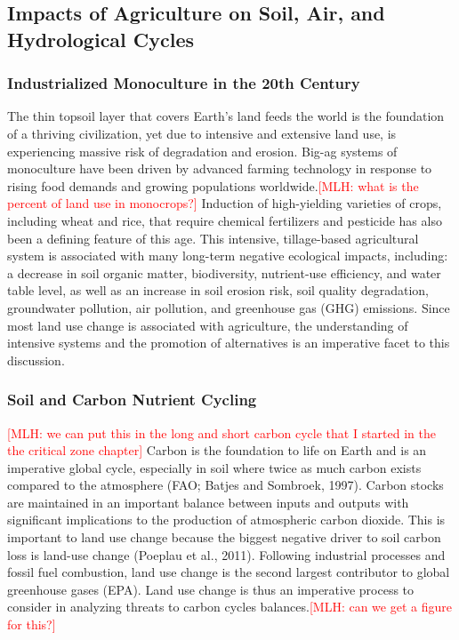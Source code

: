 \documentclass{book}\usepackage{knitr}
\newcommand{\red}[1]{\textcolor{red}{[MLH: #1]}}
\begin{document}
\begin{knitrout}
\begin{kframe}
\subsection{Impacts of Agriculture on Soil, Air, and Hydrological Cycles}

\subsubsection{Industrialized Monoculture in the 20th Century}
The thin topsoil layer that covers Earth’s land feeds the world is the foundation of a thriving civilization, yet due to intensive and extensive land use, is experiencing massive risk of degradation and erosion. Big-ag systems of monoculture have been driven by advanced farming technology in response to rising food demands and growing populations worldwide.\red{what is the percent of land use in monocrops?} Induction of high-yielding varieties of crops, including wheat and rice, that require chemical fertilizers and pesticide has also been a defining feature of this age. This intensive, tillage-based agricultural system is associated with many long-term negative ecological impacts, including: a decrease in soil organic matter, biodiversity, nutrient-use efficiency, and water table level, as well as an increase in soil erosion risk, soil quality degradation, groundwater pollution, air pollution, and greenhouse gas (GHG) emissions. Since most land use change is associated with agriculture, the understanding of intensive systems and the promotion of alternatives is an imperative facet to this discussion.

\subsubsection{Soil and Carbon Nutrient Cycling}\red{we can put this in the long and short carbon cycle that I started in the the critical zone chapter}
Carbon is the foundation to life on Earth and is an imperative global cycle, especially in soil where twice as much carbon exists compared to the atmosphere (FAO; Batjes and Sombroek, 1997). Carbon stocks are maintained in an important balance between inputs and outputs with significant implications to the production of atmospheric carbon dioxide. This is important to land use change because the biggest negative driver to soil carbon loss is land-use change (Poeplau et al., 2011). Following industrial processes and fossil fuel combustion, land use change is the second largest contributor to global greenhouse gases (EPA). Land use change is thus an imperative process to consider in analyzing threats to carbon cycles balances.\red{can we get a figure for this?}


\end{kframe}
\end{knitrout}
\end{document}
